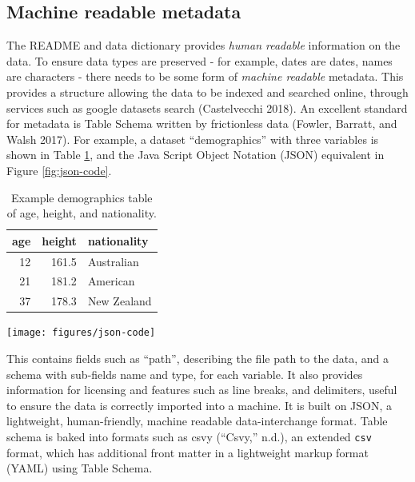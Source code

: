 \documentclass[
]{article}
\let\origfigure\figure
\let\endorigfigure\endfigure
\renewenvironment{figure}[1][2] {
    \expandafter\origfigure\expandafter[H]
} {
    \endorigfigure
}
\begin{document}
\hypertarget{machine-metadata}{%
\subsection{Machine readable metadata}\label{machine-metadata}}

The README and data dictionary provides \emph{human readable} information on the data. To ensure data types are preserved - for example, dates are dates, names are characters - there needs to be some form of \emph{machine readable} metadata. This provides a structure allowing the data to be indexed and searched online, through services such as google datasets search (Castelvecchi 2018). An excellent standard for metadata is Table Schema written by frictionless data (Fowler, Barratt, and Walsh 2017). For example, a dataset ``demographics'' with three variables is shown in Table \ref{tab:table-machine-readable}, and the Java Script Object Notation (JSON) equivalent in Figure \ref{fig:json-code}.

\begin{table}[!h]

\caption{\label{tab:table-machine-readable}Example demographics table of age, height, and nationality.}
\centering
\begin{tabular}[t]{rrl}
\toprule
age & height & nationality\\
\midrule
12 & 161.5 & Australian\\
21 & 181.2 & American\\
37 & 178.3 & New Zealand\\
\bottomrule
\end{tabular}
\end{table}

\begin{figure}

{\centering \texttt{[image: figures/json-code]} 

}

\caption{Example snippet of some Table Schema data for a dataset with three variables. This provides a description of each field, and the type of field.}\label{fig:json-code}
\end{figure}

This contains fields such as ``path'', describing the file path to the data, and a schema with sub-fields name and type, for each variable. It also provides information for licensing and features such as line breaks, and delimiters, useful to ensure the data is correctly imported into a machine. It is built on JSON, a lightweight, human-friendly, machine readable data-interchange format. Table schema is baked into formats such as csvy (``Csvy,'' n.d.), an extended \texttt{csv} format, which has additional front matter in a lightweight markup format (YAML) using Table Schema.
\end{document}
